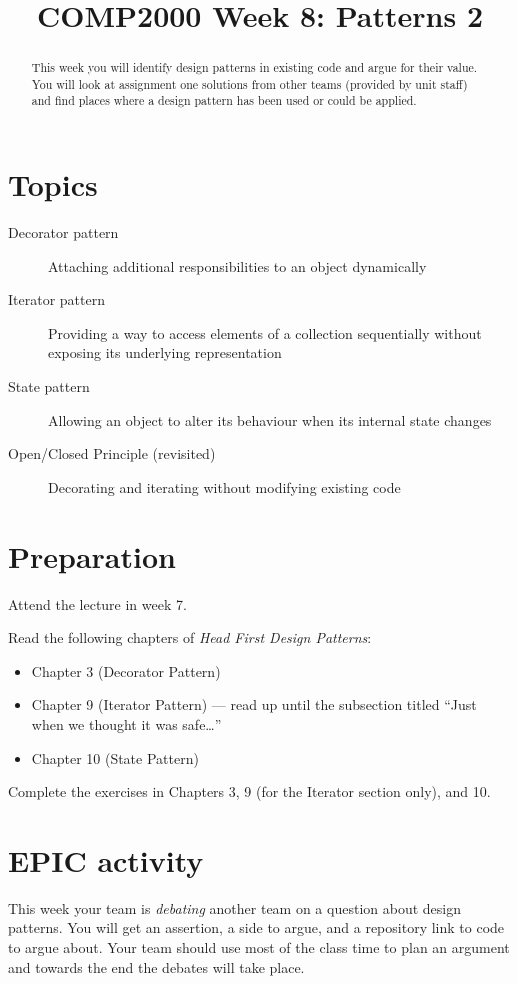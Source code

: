 \documentclass[twoside=false,DIV=14]{scrartcl}
\title{\color{redish} \vspace{-1em}COMP2000 Week 8: Patterns 2}
\begin{document}
{\color{blackish}\maketitle}\vspace{-7em}

\begin{abstract}
This week you will identify design patterns in existing code and argue for their value.  You will look at assignment one solutions from other teams (provided by unit staff) and find places where a design pattern has been used or could be applied.
\end{abstract}

\section*{Topics}
\begin{description}
\item[Decorator pattern] Attaching additional responsibilities to an object dynamically
\item[Iterator pattern] Providing a way to access elements of a collection sequentially without exposing its underlying representation
\item[State pattern] Allowing an object to alter its behaviour when its internal state changes
\item[Open/Closed Principle (revisited)] Decorating and iterating without modifying existing code
\end{description}

\section*{Preparation}
Attend the lecture in week 7.

Read the following chapters of \textit{Head First Design Patterns}:
\begin{itemize}
    \item Chapter 3 (Decorator Pattern)
    \item Chapter 9 (Iterator Pattern) --- read up until the subsection titled ``Just when we thought it was safe\ldots''
    \item Chapter 10 (State Pattern)
\end{itemize}
Complete the exercises in Chapters 3, 9 (for the Iterator section only), and 10.


\section*{EPIC activity}
This week your team is \emph{debating} another team on a question about design patterns.  You will get an assertion, a side to argue, and a repository link to code to argue about.  Your team should use most of the class time to plan an argument and towards the end the debates will take place.  
\end{document}
